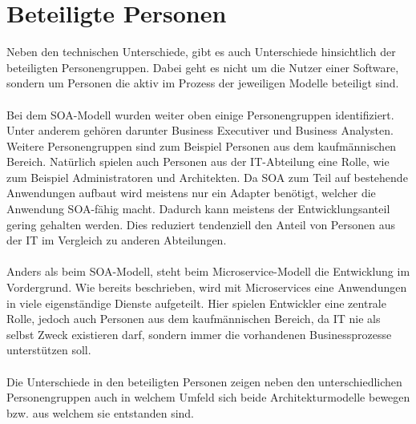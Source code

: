 \section{Beteiligte Personen}
\label{sec:FazitBeteiligtePersonen}
Neben den technischen Unterschiede, gibt es auch Unterschiede hinsichtlich der beteiligten Personengruppen. Dabei geht es nicht um die Nutzer einer Software, sondern um Personen die aktiv im Prozess der jeweiligen Modelle beteiligt sind.
\\\\
Bei dem SOA-Modell wurden weiter oben einige Personengruppen identifiziert. Unter anderem gehören darunter Business Executiver und Business Analysten. Weitere Personengruppen sind zum Beispiel Personen aus dem kaufmännischen Bereich. Natürlich spielen auch Personen aus der IT-Abteilung eine Rolle, wie zum Beispiel Administratoren und Architekten. Da SOA zum Teil auf bestehende Anwendungen aufbaut wird meistens nur ein Adapter benötigt, welcher die Anwendung SOA-fähig macht. Dadurch kann meistens der Entwicklungsanteil gering gehalten werden. Dies reduziert tendenziell den Anteil von Personen aus der IT im Vergleich zu anderen Abteilungen.
\\\\
Anders als beim SOA-Modell, steht beim Microservice-Modell die Entwicklung im Vordergrund. Wie bereits beschrieben, wird mit Microservices eine Anwendungen in viele eigenständige Dienste aufgeteilt. Hier spielen Entwickler eine zentrale Rolle, jedoch auch Personen aus dem kaufmännischen Bereich, da IT nie als selbst Zweck existieren darf, sondern immer die vorhandenen Businessprozesse unterstützen soll.
\\\\
Die Unterschiede in den beteiligten Personen zeigen neben den unterschiedlichen Personengruppen auch in welchem Umfeld sich beide Architekturmodelle bewegen bzw. aus welchem sie entstanden sind.